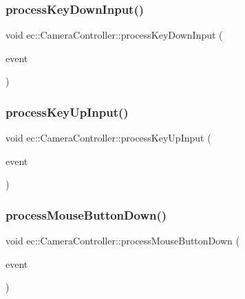\subsubsection{\texorpdfstring{process\+Key\+Down\+Input()}{processKeyDownInput()}}
{\footnotesize\ttfamily void ec\+::\+Camera\+Controller\+::process\+Key\+Down\+Input (\begin{DoxyParamCaption}\item[{const \mbox{\hyperlink{structec_1_1_keyboard_event}{Keyboard\+Event}} \&}]{event }\end{DoxyParamCaption})\hspace{0.3cm}{\ttfamily [protected]}}

\mbox{\label{classec_1_1_camera_controller_ac92bb03a95ddf600b4a08b5b043b601e}} 
\subsubsection{\texorpdfstring{process\+Key\+Up\+Input()}{processKeyUpInput()}}
{\footnotesize\ttfamily void ec\+::\+Camera\+Controller\+::process\+Key\+Up\+Input (\begin{DoxyParamCaption}\item[{const \mbox{\hyperlink{structec_1_1_keyboard_event}{Keyboard\+Event}} \&}]{event }\end{DoxyParamCaption})\hspace{0.3cm}{\ttfamily [protected]}}

\mbox{\label{classec_1_1_camera_controller_ac2d7bd60346a2f23f591b9b5c05550dc}} 
\subsubsection{\texorpdfstring{process\+Mouse\+Button\+Down()}{processMouseButtonDown()}}
{\footnotesize\ttfamily void ec\+::\+Camera\+Controller\+::process\+Mouse\+Button\+Down (\begin{DoxyParamCaption}\item[{const \mbox{\hyperlink{structec_1_1_mouse_event}{Mouse\+Event}} \&}]{event }\end{DoxyParamCaption})\hspace{0.3cm}{\ttfamily [protected]}}

